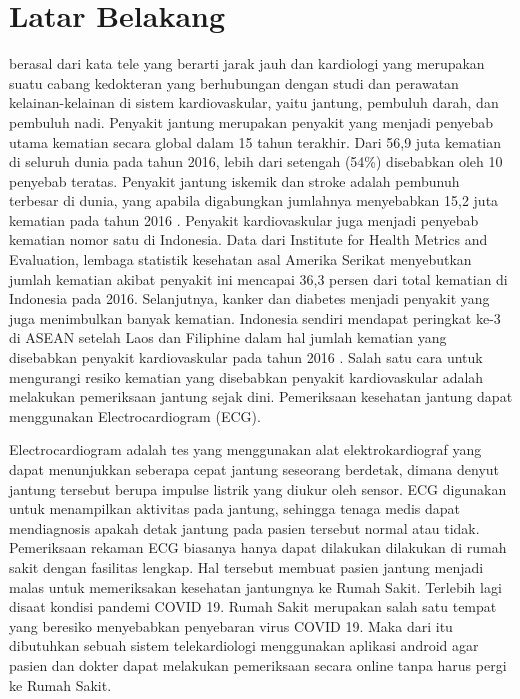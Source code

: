 \documentclass[conference]{IEEEtran}
\begin{document}
	\section{Latar Belakang}
	 berasal dari kata tele yang berarti jarak jauh dan kardiologi yang merupakan suatu cabang kedokteran yang berhubungan dengan studi dan perawatan kelainan-kelainan di sistem kardiovaskular, yaitu jantung, pembuluh darah, dan pembuluh nadi\cite{cit:1}. Penyakit jantung merupakan penyakit yang menjadi penyebab utama kematian secara global dalam 15 tahun terakhir. Dari 56,9 juta kematian di seluruh dunia pada tahun 2016, lebih dari setengah (54\%) disebabkan oleh 10 penyebab teratas. Penyakit jantung iskemik dan stroke adalah pembunuh terbesar di dunia, yang apabila digabungkan jumlahnya menyebabkan  15,2 juta kematian pada tahun 2016 \cite{cit:2}. Penyakit kardiovaskular juga menjadi penyebab kematian nomor satu di Indonesia. Data dari Institute for Health Metrics and Evaluation, lembaga statistik kesehatan asal Amerika Serikat menyebutkan jumlah kematian akibat penyakit ini mencapai 36,3 persen dari total kematian di Indonesia pada 2016. Selanjutnya, kanker dan diabetes menjadi penyakit yang juga menimbulkan banyak kematian. Indonesia sendiri mendapat peringkat ke-3 di ASEAN setelah Laos dan Filiphine dalam hal jumlah kematian yang disebabkan penyakit kardiovaskular pada tahun 2016 \cite{cit:3}. Salah satu cara untuk mengurangi resiko kematian yang disebabkan penyakit kardiovaskular adalah melakukan pemeriksaan jantung sejak dini. Pemeriksaan kesehatan jantung dapat menggunakan Electrocardiogram (ECG).
	
	
	\vspace{1ex}
	
	Electrocardiogram adalah tes yang menggunakan alat elektrokardiograf yang dapat menunjukkan seberapa cepat jantung seseorang berdetak, dimana denyut jantung tersebut berupa impulse listrik yang diukur oleh sensor. ECG digunakan untuk menampilkan aktivitas pada jantung, sehingga tenaga medis dapat mendiagnosis apakah detak jantung pada pasien tersebut normal atau tidak. Pemeriksaan rekaman ECG biasanya hanya dapat dilakukan
	dilakukan di rumah sakit dengan fasilitas lengkap. Hal tersebut membuat pasien jantung menjadi malas untuk memeriksakan kesehatan jantungnya ke Rumah Sakit. Terlebih lagi disaat kondisi pandemi COVID 19. Rumah Sakit merupakan salah satu tempat yang beresiko menyebabkan penyebaran virus COVID 19. Maka dari itu dibutuhkan sebuah sistem telekardiologi menggunakan aplikasi android agar pasien dan dokter dapat melakukan pemeriksaan secara online tanpa harus pergi ke Rumah Sakit.
	
\end{document}
